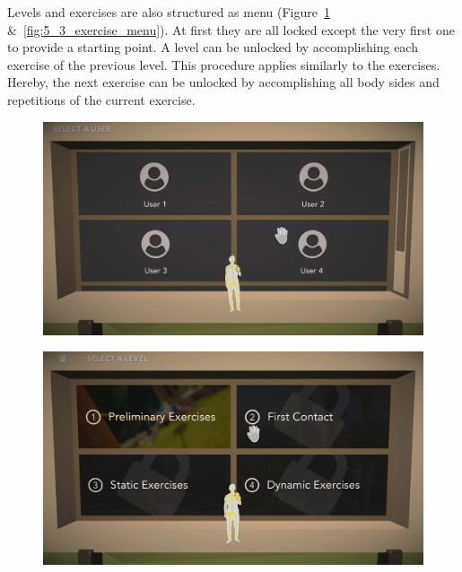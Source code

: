 Levels and exercises are also structured as menu (Figure~\ref{fig:5_3_level_menu} \&~\ref{fig:5_3_exercise_menu}).
At first they are all locked except the very first one to provide a starting point.
A level can be unlocked by accomplishing each exercise of the previous level.
This procedure applies similarly to the exercises.
Hereby, the next exercise can be unlocked by accomplishing all body sides and repetitions of the current exercise.
\begin{figure}[htb]
	\centering
	\begin{minipage}[t]{0.32\linewidth}
		\centering
		\includegraphics[width=1\linewidth]{Pictures/5_Workflow/5_UserMenu}
		\label{fig:5_3_user_menu}
	\end{minipage}
	\hfill
	\begin{minipage}[t]{0.32\linewidth}
		\centering
		\includegraphics[width=1\linewidth]{Pictures/5_Workflow/6_LevelMenu}
		\label{fig:5_3_level_menu}

\end{minipage}
\end{figure}
